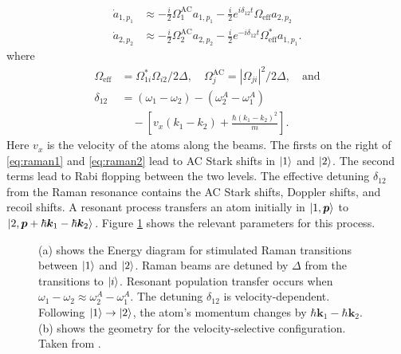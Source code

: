 \documentclass[reprint,
nofootinbib,
amsmath,amssymb,
aps]{revtex4-1}
\newcommand{\f}[2]{\frac{#1}{#2}}
\newcommand{\lb}{\left[}
\newcommand{\rb}{\right]}
\begin{document}
\begin{align}
\dot{a}_{1,p_1} &\approx -\f{i}{2}\Omega_1^{\text{AC}} a_{1,p_1} - \f{i}{2}e^{i\delta_{12} t} \Omega_\text{eff} a_{2,p_2}\label{eq:raman1}\\
\dot{a}_{2,p_2} &\approx -\f{i}{2}\Omega_2^{\text{AC}} a_{2,p_2} - \f{i}{2}e^{-i\delta_{12} t} \Omega_{\text{eff}}^* a_{1,p_1}\label{eq:raman2}.
\end{align}
where  
\begin{align*}
\Omega_\text{eff} &= \Omega_{1i}^* \Omega_{i2}/2\Delta, \quad \Omega_j^{\text{AC}} = |\Omega_{ji}|^2/2\Delta, \quad \text{and}\\
\delta_{12} &= (\omega_1 - \omega_2) - (\omega_2^A - \omega_1^A)\\
&\quad- \lb  v_x(k_1-k_2) + \f{\hbar (k_1 - k_2)^2}{ m} \rb.
\end{align*}
Here $v_x$ is the velocity of the atoms along the beams. The firsts on the right of \eqref{eq:raman1} and \eqref{eq:raman2} lead to AC Stark shifts in $\ket{1}$ and $\ket{2}$. The second terms lead to Rabi flopping between the two levels. The effective detuning $\delta_{12}$ from the Raman resonance contains the AC Stark shifts, Doppler shifts, and recoil shifts. A resonant process transfers an atom initially in $\ket{1,\bm{p}}$ to $\ket{2, \bm{p} + \hbar \bm{k}_1 - \hbar \bm{k}_2}$. Figure \ref{fig:Raman} shows the relevant parameters for this process. 
 

\begin{figure}
	\quad
	\caption{(a) shows the Energy diagram for stimulated Raman transitions between $\ket{1}$ and $\ket{2}$. Raman beams are detuned by $\Delta$ from the transitions to $\ket{i}$. Resonant population transfer occurs when $\omega_1 - \omega_2 \approx \omega_2^A - \omega_1^A$. The detuning $\delta_{12}$ is velocity-dependent. Following $\ket{1} \to \ket{2}$, the atom's momentum changes by $\hbar \bm{k}_1 - \hbar \bm{k}_2$. (b) shows the geometry for the velocity-selective configuration. Taken from \cite{kasevich1992measurement}.}
	\label{fig:Raman}
\end{figure}
\end{document}
